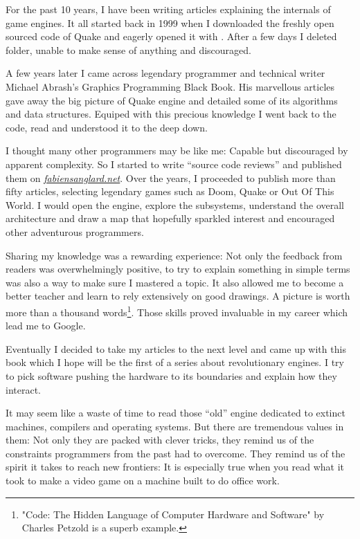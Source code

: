 \documentclass[book.tex]{subfiles}
\begin{document}
For the past 10 years, I have been writing articles explaining the internals of game engines. It all started back in 1999 when I downloaded the freshly open sourced code of \mbox{Quake} and eagerly opened it with . After a few days I deleted  folder, unable to make sense of anything and discouraged.

\bigskip

A few years later I came across legendary programmer and technical writer Michael Abrash's Graphics Programming Black Book. His marvellous articles gave away the big picture of Quake engine and detailed some of its algorithms and data structures. Equiped with this precious knowledge I went back to the code, read and understood it to the deep down.

\bigskip

I thought many other programmers may be like me: Capable but discouraged by apparent complexity. So I started to write ``source  code reviews'' and published them on 
\href{http://fabiensanglard.net}{\textit{fabiensanglard.net}}. Over the years, I proceeded to publish more than fifty articles, selecting legendary games such as Doom, Quake or Out Of This World. I would open the engine, explore the subsystems, understand the overall architecture and draw a map that hopefully sparkled interest and encouraged other adventurous programmers.

\bigskip

Sharing my knowledge was a rewarding experience: Not only the feedback from readers was overwhelmingly positive, to try to explain something in simple terms was also a way to make sure I mastered a topic. It also allowed me to become a better teacher and learn to rely extensively on good drawings. A picture
is worth more than a thousand words\footnote{"Code: The Hidden Language of Computer Hardware and Software" by Charles Petzold is a superb example.}. Those skills proved invaluable in my career which lead me to Google.

\bigskip

Eventually I decided to take my articles to the next level and came up with this book which I hope will be the first of a series about revolutionary  engines. I try to pick software pushing the hardware to its boundaries and explain how they interact.

\bigskip

It may seem like a waste of time to read those ``old'' engine dedicated to extinct machines, compilers and operating systems. But there are tremendous values in them: Not only they are packed with clever tricks, they remind us of the constraints programmers from the past had to overcome. They remind us of the spirit it takes to reach new frontiers: It is especially true when you read what it took to make a video game on a machine built to do office work.\\
\end{document}
